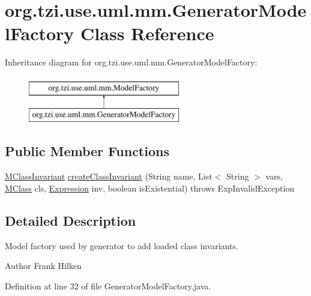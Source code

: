 \hypertarget{classorg_1_1tzi_1_1use_1_1uml_1_1mm_1_1_generator_model_factory}{\section{org.\-tzi.\-use.\-uml.\-mm.\-Generator\-Model\-Factory Class Reference}
\label{classorg_1_1tzi_1_1use_1_1uml_1_1mm_1_1_generator_model_factory}
}
Inheritance diagram for org.\-tzi.\-use.\-uml.\-mm.\-Generator\-Model\-Factory\-:\begin{figure}[H]
\begin{center}
\leavevmode
\includegraphics[height=2.000000cm]{classorg_1_1tzi_1_1use_1_1uml_1_1mm_1_1_generator_model_factory}
\end{center}
\end{figure}
\subsection*{Public Member Functions}
\begin{DoxyCompactItemize}
\item 
\hyperlink{classorg_1_1tzi_1_1use_1_1uml_1_1mm_1_1_m_class_invariant}{M\-Class\-Invariant} \hyperlink{classorg_1_1tzi_1_1use_1_1uml_1_1mm_1_1_generator_model_factory_a244d682ed380425fc8cc18924f3e3f7d}{create\-Class\-Invariant} (String name, List$<$ String $>$ vars, \hyperlink{interfaceorg_1_1tzi_1_1use_1_1uml_1_1mm_1_1_m_class}{M\-Class} cls, \hyperlink{classorg_1_1tzi_1_1use_1_1uml_1_1ocl_1_1expr_1_1_expression}{Expression} inv, boolean is\-Existential)  throws Exp\-Invalid\-Exception 
\end{DoxyCompactItemize}


\subsection{Detailed Description}
Model factory used by generator to add loaded class invariants.

\begin{DoxyAuthor}{Author}
Frank Hilken 
\end{DoxyAuthor}


Definition at line 32 of file Generator\-Model\-Factory.\-java.



